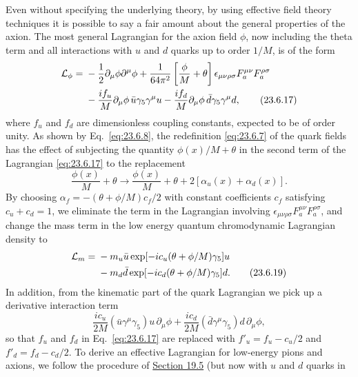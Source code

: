 Even without specifying the underlying theory, by using effective field
theory techniques it is possible to say a fair amount about the general
properties of the axion. The most general Lagrangian for the axion field
$\phi$, now including the theta term and all interactions with $u$ and
$d$ quarks up to order $1/M$, is of the form
\begin{align}
\mathcal L_\phi={}&-\frac12\partial_\mu\phi\partial^\mu\phi
+\frac{1}{64\pi^2}\left[\frac{\phi}{M}+\theta\right]
\epsilon_{\mu\nu\rho\sigma}F_a^{\mu\nu}F_a^{\rho\sigma}
\notag\\
&-\frac{i f_u}{M}\partial_\mu\phi\,
\bar u\gamma_5\gamma^\mu u
-\frac{i f_d}{M}\partial_\mu\phi\,
\bar d\gamma_5\gamma^\mu d,
\tag{23.6.17}\label{eq:23.6.17}
\end{align}
where $f_u$ and $f_d$ are dimensionless coupling constants, expected to
be of order unity. As shown by Eq.~\eqref{eq:23.6.8}, the redefinition
\eqref{eq:23.6.7} of the quark fields has the effect of subjecting the
quantity $\phi(x)/M+\theta$ in the second term of the Lagrangian
\eqref{eq:23.6.17} to the replacement
\begin{equation}
\frac{\phi(x)}{M}+\theta\longrightarrow
\frac{\phi(x)}{M}+\theta+2[\alpha_u(x)+\alpha_d(x)].
\tag{23.6.18}\label{eq:23.6.18}
\end{equation}
By choosing $\alpha_f=-(\theta+\phi/M)c_f/2$ with constant coefficients
$c_f$ satisfying $c_u+c_d=1$, we eliminate the term in the Lagrangian
involving $\epsilon_{\mu\nu\rho\sigma}F_a^{\mu\nu}F_a^{\rho\sigma}$,
and change the mass term in the low energy quantum chromodynamic
Lagrangian density to
\begin{align}
\mathcal L_m={}&-m_u\bar u
\exp[-ic_u(\theta+\phi/M)\gamma_5]u
\notag\\
&-m_d\bar d
\exp[-ic_d(\theta+\phi/M)\gamma_5]d.
\tag{23.6.19}\label{eq:23.6.19}
\end{align}
In addition, from the kinematic part of the quark Lagrangian we pick up
a derivative interaction term
\begin{equation}
\frac{i c_u}{2M}(\bar u\gamma^\mu\gamma_5)u\,\partial_\mu\phi
+\frac{i c_d}{2M}(\bar d\gamma^\mu\gamma_5)d\,\partial_\mu\phi,
\tag{23.6.20}\label{eq:23.6.20}
\end{equation}
so that $f_u$ and $f_d$ in Eq.~\eqref{eq:23.6.17} are replaced with
$f'_u=f_u-c_u/2$ and $f'_d=f_d-c_d/2$. To derive an effective Lagrangian
for low-energy pions and axions, we follow the procedure of
\hyperref[sec:19.5]{Section 19.5} (but now with $u$ and $d$ quarks in
